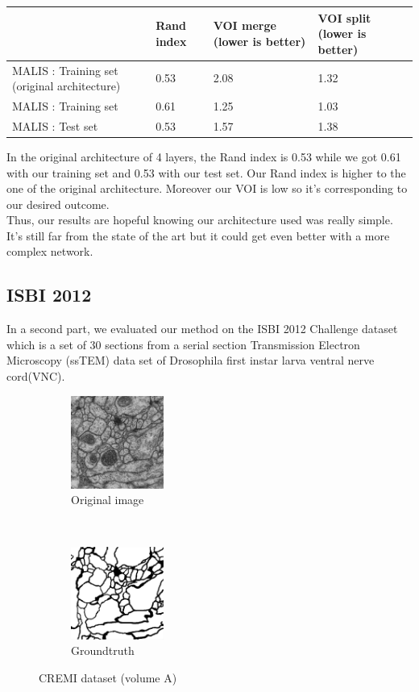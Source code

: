 \begin{center}
	\begin{tabular}{llll}
		\hline
		& Rand index & VOI merge (lower is better) & VOI split (lower is better) \\
		\hline
		MALIS : Training set (original architecture) & 0.53 & 2.08 & 1.32\\
		MALIS : Training set & 0.61 & 1.25 & 1.03\\
		MALIS : Test set & 0.53 & 1.57 & 1.38\\
	\end{tabular}
\end{center}

In the original architecture of 4 layers, the Rand index is 0.53 while we got 0.61 with our training set and 0.53 with our test set.
Our Rand index is higher to the one of the original architecture.
Moreover our VOI is low so it's corresponding to our desired outcome.\\

Thus, our results are hopeful knowing our architecture used was really simple.\\ 
It's still far from the state of the art but it could get even better with a more complex network.\\

\subsection{ISBI 2012}
In a second part, we evaluated our method on the ISBI 2012 Challenge dataset which is a set of 30 sections from a serial section Transmission Electron Microscopy (ssTEM) data set of Drosophila first instar larva ventral nerve cord(VNC).\\

\begin{figure}[t!]
    \centering
    \begin{subfigure}[t]{0.5\textwidth}
        \centering
        \includegraphics[height=1.2in]{./images/isbi_orig_1.png}
        \caption{Original image}
    \end{subfigure}%
    ~ 
    \begin{subfigure}[t]{0.5\textwidth}
        \centering
        \includegraphics[height=1.2in]{./images/isbi_gt_1.png}
        \caption{Groundtruth}
    \end{subfigure}
    \caption{CREMI dataset (volume A)}
\end{figure}

